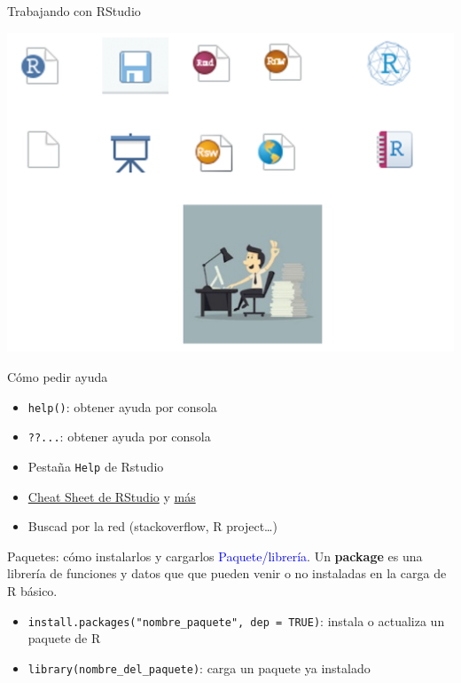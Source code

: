 \documentclass[
  ignorenonframetext,
  aspectratio=169]{beamer}
\providecommand{\tightlist}{%
  \setlength{\itemsep}{0pt}\setlength{\parskip}{0pt}}
\newcommand\blue[1]{\textcolor{blue}{#1}}
\begin{document}
\begin{frame}{Trabajando con RStudio}
\protect\hypertarget{trabajando-con-rstudio}{}
\begin{center}\includegraphics[width=0.7\linewidth]{Imgs/easy_plus_tools} \end{center}
\end{frame}

\begin{frame}[fragile]{Cómo pedir ayuda}
\protect\hypertarget{cuxf3mo-pedir-ayuda}{}
\begin{itemize}
\tightlist
\item
  \texttt{help()}: obtener ayuda por consola
\item
  \texttt{??...}: obtener ayuda por consola
\item
  Pestaña \texttt{Help} de Rstudio
\item
  \href{https://www.rstudio.com/wp-content/uploads/2015/02/rmarkdown-cheatsheet.pdf}{Cheat
  Sheet de RStudio} y
  \href{https://www.google.com/search?q=Cheat+Sheet++RStudio\&rlz=1C1CHBF_esES891ES891\&sxsrf=ALiCzsYTamg5AX36RN8EhpV8lSO55ijfRw\%3A1664221782651\&ei=VgIyY5GzJ5nCa6rfovAP\&ved=0ahUKEwiRtrqhnbP6AhUZ4RoKHaqvCP4Q4dUDCA4\&uact=5\&oq=Cheat+Sheet++RStudio\&gs_lcp=Cgdnd3Mtd2l6EAMyCAgAEB4QBxATMggIABAeEAUQEzIICAAQHhAFEBMyCAgAEB4QBRATMggIABAeEAUQEzIICAAQHhAFEBMyCAgAEB4QBRATMggIABAeEAgQEzIICAAQHhAIEBMyCAgAEB4QCBATOgoIABBHENYEELADOggIABAeEAgQB0oECEEYAEoECEYYAFCmCljnC2DOEWgBcAF4AIABaogBzQGSAQMxLjGYAQCgAQHIAQjAAQE\&sclient=gws-wiz}{más}
\item
  Buscad por la red (stackoverflow, R project\ldots)
\end{itemize}
\end{frame}

\begin{frame}[fragile]{Paquetes: cómo instalarlos y cargarlos}
\protect\hypertarget{paquetes-cuxf3mo-instalarlos-y-cargarlos}{}
\blue{Paquete/librería}. Un \textbf{package} es una librería de
funciones y datos que que pueden venir o no instaladas en la carga de R
básico.

\begin{itemize}
\tightlist
\item
  \texttt{install.packages("nombre\_paquete",\ dep\ =\ TRUE)}: instala o
  actualiza un paquete de R
\item
  \texttt{library(nombre\_del\_paquete)}: carga un paquete ya instalado
\end{itemize}
\end{frame}
\end{document}
